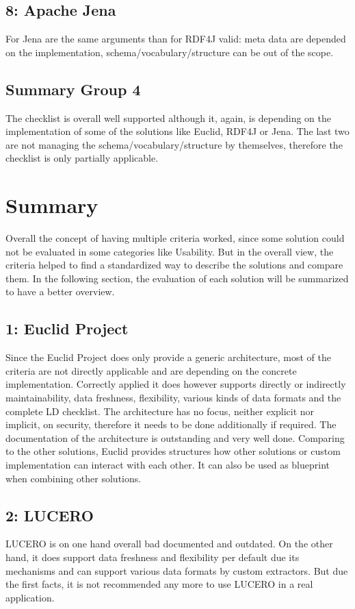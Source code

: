 \subsection*{8: Apache Jena}
For Jena are the same arguments than for RDF4J valid: meta data are depended on the implementation, schema/vocabulary/structure can be out of the scope.

\subsection{Summary Group 4}
The checklist is overall well supported although it, again, is depending on the implementation of some of the solutions like Euclid, RDF4J or Jena. The last two are not managing the schema/vocabulary/structure by themselves, therefore the checklist is only partially applicable.

\section{Summary}\label{comp_summary}

Overall the concept of having multiple criteria worked, since some solution could not be evaluated in some categories like Usability. But in the overall view, the criteria helped to find a standardized way to describe the solutions and compare them. In the following section, the evaluation of each solution will be summarized to have a better overview.

\subsection*{1: Euclid Project}
Since the Euclid Project does only provide a generic architecture, most of the criteria are not directly applicable and are depending on the concrete implementation. Correctly applied it does however supports directly or indirectly maintainability, data freshness, flexibility, various kinds of data formats and the complete LD checklist. The architecture has no focus, neither explicit nor implicit, on security, therefore it needs to be done additionally if required. The documentation of the architecture is outstanding and very well done.
Comparing to the other solutions, Euclid provides structures how other solutions or custom implementation can interact with each other. It can also be used as blueprint when combining other solutions.

\subsection*{2: LUCERO}
LUCERO is on one hand overall bad documented and outdated. On the other hand, it does support data freshness and flexibility per default due its mechanisms and can support various data formats by custom extractors. But due the first facts, it is not recommended any more to use LUCERO in a real application.

